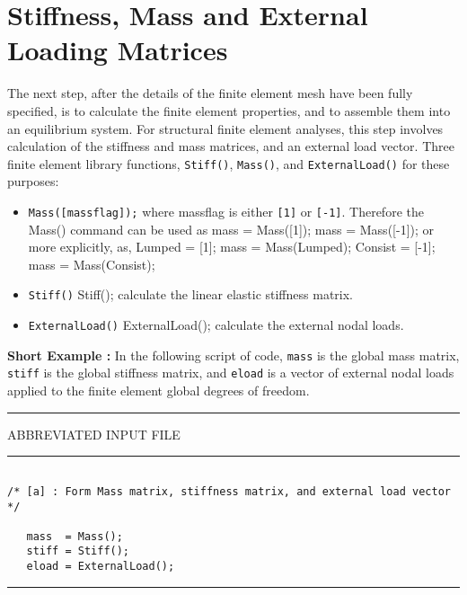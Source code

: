 \section{Stiffness, Mass and External Loading Matrices}

\vspace{0.15 in}
\noindent\hspace{0.5 in}
The next step, after the details of the finite element mesh have been fully specified,
is to calculate the finite element properties, and to assemble them into an equilibrium system.
For structural finite element analyses, this step involves calculation of
the stiffness and mass matrices, and an external load vector.
Three finite element library functions, {\tt Stiff()}, {\tt Mass()}, 
and {\tt ExternalLoad()} for these purposes:

\begin{itemize}
\item{\tt Mass([massflag]);}
where massflag is either {\tt [1]} or {\tt [-1]}. Therefore the Mass() command can be 
used as mass = Mass([1]); mass = Mass([-1]); or more explicitly, as, Lumped = [1]; mass = Mass(Lumped);
Consist = [-1]; mass = Mass(Consist);

\item{\tt Stiff()}
Stiff(); calculate the linear elastic stiffness matrix.

\item{\tt ExternalLoad()}
ExternalLoad(); calculate the external nodal loads.
\end{itemize}

\vspace{0.15 in}\noindent
{\bf Short Example :} In the following script of code, 
{\tt mass} is the global mass matrix,
{\tt stiff} is the global stiffness matrix,
and {\tt eload} is a vector of external nodal loads applied to
the finite element global degrees of freedom.

\vspace{0.15 in}
\begin{footnotesize}
\noindent
{\rule{2.1 in}{0.035 in} ABBREVIATED INPUT FILE \rule{2.1 in}{0.035 in} }
\begin{verbatim}

/* [a] : Form Mass matrix, stiffness matrix, and external load vector */

   mass  = Mass();
   stiff = Stiff();
   eload = ExternalLoad();
\end{verbatim}
\rule{6.25 in}{0.035 in}
\end{footnotesize}

